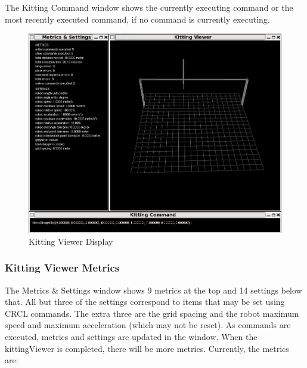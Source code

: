 The Kitting Command window shows the currently executing command or the
most recently executed command, if no command is currently executing.

\begin{figure}[ht]
\begin{center}
\includegraphics[width=16cm]{images/kittingViewer.jpg}
\caption{Kitting Viewer Display}
\label{fig:KittingViewer}
\end{center}
\end{figure}

\subsubsection{Kitting Viewer Metrics}
The Metrics \& Settings window shows 9 metrics at the top and 14 settings
below that. All but three of the settings correspond to items that may be
set using CRCL commands. The extra three are the grid spacing and the robot
maximum speed and maximum acceleration (which may not be reset). As
commands are executed, metrics and settings are updated in the window.
When the kittingViewer is completed, there will be more metrics.
Currently, the metrics are:\\

